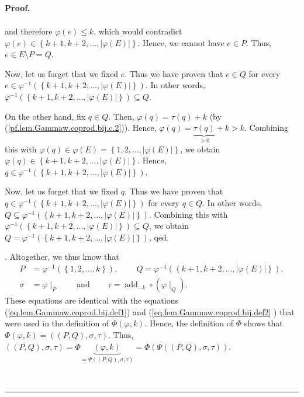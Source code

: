 \documentclass[numbers=enddot,12pt,final,onecolumn,notitlepage,abstracton]{scrartcl}
\theoremstyle{definition}
\newenvironment{proof}[1][Proof]{\noindent\textbf{#1.} }{\ \rule{0.5em}{0.5em}}
\newenvironment{verlong}{}{}
\begin{document}
\begin{verlong}
\begin{proof}
{\begin{align*}
\end{align*}
and therefore $\varphi\left(  e\right)  \leq k$, which would contradict
$\varphi\left(  e\right)  \in\left\{  k+1,k+2,\ldots,\left\vert \varphi\left(
E\right)  \right\vert \right\}  $. Hence, we cannot have $e\in P$. Thus, $e\in
E\setminus P=Q$.
\par
Now, let us forget that we fixed $e$. Thus we have proven that $e\in Q$ for
every $e\in\varphi^{-1}\left(  \left\{  k+1,k+2,\ldots,\left\vert
\varphi\left(  E\right)  \right\vert \right\}  \right)  $. In other words,
$\varphi^{-1}\left(  \left\{  k+1,k+2,\ldots,\left\vert \varphi\left(
E\right)  \right\vert \right\}  \right)  \subseteq Q$.
\par
On the other hand, fix $q\in Q$. Then, $\varphi\left(  q\right)  =\tau\left(
q\right)  +k$ (by (\ref{pf.lem.Gammaw.coprod.bij.c.2})). Hence, $\varphi
\left(  q\right)  =\underbrace{\tau\left(  q\right)  }_{>0}+k>k$. Combining
this with $\varphi\left(  q\right)  \in\varphi\left(  E\right)  =\left\{
1,2,\ldots,\left\vert \varphi\left(  E\right)  \right\vert \right\}  $, we
obtain $\varphi\left(  q\right)  \in\left\{  k+1,k+2,\ldots,\left\vert
\varphi\left(  E\right)  \right\vert \right\}  $. Hence, $q\in\varphi
^{-1}\left(  \left\{  k+1,k+2,\ldots,\left\vert \varphi\left(  E\right)
\right\vert \right\}  \right)  $.
\par
Now, let us forget that we fixed $q$. Thus we have proven that $q\in
\varphi^{-1}\left(  \left\{  k+1,k+2,\ldots,\left\vert \varphi\left(
E\right)  \right\vert \right\}  \right)  $ for every $q\in Q$. In other words,
$Q\subseteq\varphi^{-1}\left(  \left\{  k+1,k+2,\ldots,\left\vert
\varphi\left(  E\right)  \right\vert \right\}  \right)  $. Combining this with
$\varphi^{-1}\left(  \left\{  k+1,k+2,\ldots,\left\vert \varphi\left(
E\right)  \right\vert \right\}  \right)  \subseteq Q$, we obtain
$Q=\varphi^{-1}\left(  \left\{  k+1,k+2,\ldots,\left\vert \varphi\left(
E\right)  \right\vert \right\}  \right)  $, qed.}. Altogether, we thus know
that
\begin{align*}
P  &  =\varphi^{-1}\left(  \left\{  1,2,\ldots,k\right\}  \right)
,\ \ \ \ \ \ \ \ \ \ Q=\varphi^{-1}\left(  \left\{  k+1,k+2,\ldots,\left\vert
\varphi\left(  E\right)  \right\vert \right\}  \right)  ,\\
\sigma &  =\varphi\mid_{P}\ \ \ \ \ \ \ \ \ \ \text{and}%
\ \ \ \ \ \ \ \ \ \ \tau=\operatorname{add}_{-k}\circ\left(
\varphi\mid_{Q}\right)  .
\end{align*}
These equations are identical with the equations
(\ref{eq.lem.Gammaw.coprod.bij.def1}) and (\ref{eq.lem.Gammaw.coprod.bij.def2}%
) that were used in the definition of $\Phi\left(  \varphi,k\right)  $. Hence,
the definition of $\Phi$ shows that $\Phi\left(  \varphi,k\right)  =\left(
\left(  P,Q\right)  ,\sigma,\tau\right)  $. Thus, $\left(  \left(  P,Q\right)
,\sigma,\tau\right)  =\Phi\underbrace{\left(  \varphi,k\right)  }%
_{=\Psi\left(  \left(  P,Q\right)  ,\sigma,\tau\right)  }=\Phi\left(
\Psi\left(  \left(  P,Q\right)  ,\sigma,\tau\right)  \right)  $.


\end{proof}
\end{verlong}
\end{document}
